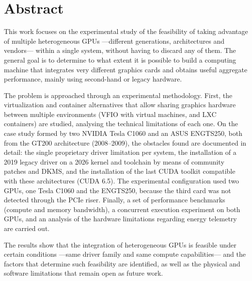\newpage

\section*{Abstract}

This work focuses on the experimental study of the feasibility of taking advantage of multiple heterogeneous GPUs ---different generations, architectures and vendors--- within a single system, without having to discard any of them. The general goal is to determine to what extent it is possible to build a computing machine that integrates very different graphics cards and obtains useful aggregate performance, mainly using second-hand or legacy hardware.

The problem is approached through an experimental methodology. First, the virtualization and container alternatives that allow sharing graphics hardware between multiple environments (VFIO with virtual machines, and LXC containers) are studied, analysing the technical limitations of each one. On the case study formed by two NVIDIA Tesla C1060 and an ASUS ENGTS250, both from the GT200 architecture (2008--2009), the obstacles found are documented in detail: the single proprietary driver limitation per system, the installation of a 2019 legacy driver on a 2026 kernel and toolchain by means of community patches and DKMS, and the installation of the last CUDA toolkit compatible with these architectures (CUDA 6.5). The experimental configuration used two GPUs, one Tesla C1060 and the ENGTS250, because the third card was not detected through the PCIe riser. Finally, a set of performance benchmarks (compute and memory bandwidth), a concurrent execution experiment on both GPUs, and an analysis of the hardware limitations regarding energy telemetry are carried out.

The results show that the integration of heterogeneous GPUs is feasible under certain conditions ---same driver family and same compute capabilities--- and the factors that determine such feasibility are identified, as well as the physical and software limitations that remain open as future work.
